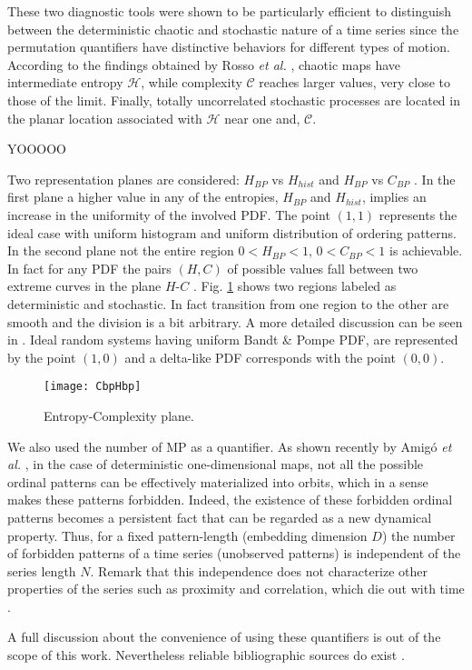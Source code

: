 These two diagnostic tools were shown to be particularly efficient to distinguish between the deterministic 
chaotic and stochastic nature of a time series since the permutation quantifiers have distinctive behaviors 
for different types of motion.
According to the findings obtained by Rosso {\it et al.\/} \cite{Rosso2007,Olivares2012B,Rosso2015PP}, 
chaotic maps have intermediate entropy ${\mathcal H}$, while complexity ${\mathcal C}$ reaches larger values, very close to those of the limit.
Finally, totally uncorrelated stochastic processes are located in the planar location associated with
${\mathcal H}$ near one and, ${\mathcal C}$.


YOOOOO

Two representation planes are considered: $H_{BP}$ vs $H_{hist}$ \cite{DeMicco2008} and $H_{BP}$ vs $C_{BP}$ \cite{Rosso2007}.
In the first plane a higher value in any of the entropies, $H_{BP}$ and $H_{hist}$, implies an increase in the uniformity of the involved PDF.
The point $(1,1)$ represents the ideal case with uniform histogram and uniform distribution of ordering patterns.
In the second plane not the entire region $0<H_{BP}<1$, $0<C_{BP}<1$ is achievable.
In fact for any PDF the pairs $(H,C)$ of possible values fall between two extreme curves in the plane $H$-$C$ \cite{Anteneodo1996}.
Fig. \ref{fig:CbpHbp} shows two regions labeled as deterministic and stochastic. In fact transition from one region to the other are smooth and the division is a bit arbitrary. 
A more detailed discussion can be seen in \cite{Rosso2007}. 
Ideal random systems having uniform Bandt \& Pompe PDF, are represented by the point $(1,0)$ \cite{Gonzalez2005} and a delta-like PDF corresponds with the point $(0,0)$.

\begin{figure}
	\centering	
	\texttt{[image: CbpHbp]}
	\caption{Entropy-Complexity plane.}
	\label{fig:CbpHbp}
\end{figure}

We also used the number of MP as a quantifier\cite{Rosso2012}.
As shown recently by Amig\'o {\it et al.} \cite{Amigo2006,Amigo2007,Amigo2008,Amigo2010}, in the case of deterministic one-dimensional maps, not all the possible ordinal patterns can be effectively materialized into orbits, which in a sense makes these patterns forbidden.
Indeed, the existence of these forbidden ordinal patterns becomes a persistent fact that can be regarded as a new dynamical property.
Thus, for a fixed pattern-length (embedding dimension $D$) the number of forbidden patterns of a time series (unobserved patterns) is independent of the series length $N$.
Remark that this independence does not characterize other properties of the series such as proximity and correlation, which die out with time \cite{Amigo2007,Amigo2010}.

A full discussion about the convenience of using these quantifiers is out of the scope of this work.
Nevertheless reliable bibliographic sources do exist \cite{Wackerbauer1994,Lopez-Ruiz1995,Rosso2007A,DeMicco2008,Rosso2010,Martin2006,Rosso2012}.



